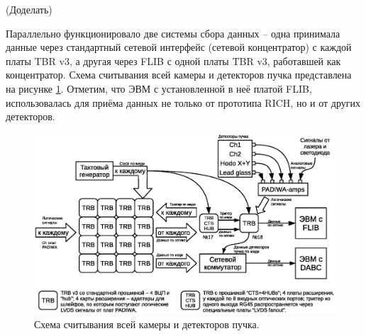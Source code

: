 (Доделать)

Параллельно функционировало две системы сбора данных – одна принимала данные через стандартный сетевой интерфейс (сетевой концентратор) с каждой платы TBR v3, а другая через FLIB с одной платы TBR v3, работавшей как концентратор. Схема считывания всей камеры и детекторов пучка представлена на рисунке \ref{fig:BeamtimeReadout}. Отметим, что ЭВМ с установленной в неё платой FLIB, использовалась для приёма данных не только от прототипа RICH, но и от других детекторов.

\begin{figure}
\includegraphics[width=1.0\textwidth]{pictures/11_Beamtime_readout_chain.eps}
\caption{Схема считывания всей камеры и детекторов пучка.}
\label{fig:BeamtimeReadout}
\end{figure}
